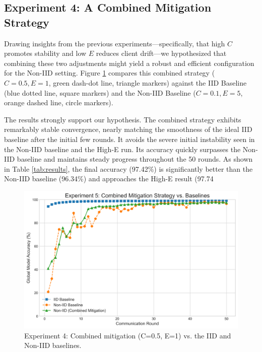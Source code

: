 \documentclass[conference]{IEEEtran}
\begin{document}
\subsection{Experiment 4: A Combined Mitigation Strategy}
Drawing insights from the previous experiments—specifically, that high $C$ promotes stability and low $E$ reduces client drift—we hypothesized that combining these two adjustments might yield a robust and efficient configuration for the Non-IID setting. Figure \ref{fig:combined} compares this combined strategy ($C=0.5, E=1$, green dash-dot line, triangle markers) against the IID Baseline (blue dotted line, square markers) and the Non-IID Baseline ($C=0.1, E=5$, orange dashed line, circle markers).

The results strongly support our hypothesis. The combined strategy exhibits remarkably stable convergence, nearly matching the smoothness of the ideal IID baseline after the initial few rounds. It avoids the severe initial instability seen in the Non-IID baseline and the High-E run. Its accuracy quickly surpasses the Non-IID baseline and maintains steady progress throughout the 50 rounds. As shown in Table \ref{tab:results}, the final accuracy (97.42\%) is significantly better than the Non-IID baseline (96.34\%) and approaches the High-E result (97.74%

\begin{figure}[htbp]
  \centering
  \includegraphics[width=0.9\linewidth]{fig_5_combined_mitigation} %
  \caption{Experiment 4: Combined mitigation (C=0.5, E=1) vs. the IID and Non-IID baselines.}
  \label{fig:combined}
\end{figure}
\end{document}
